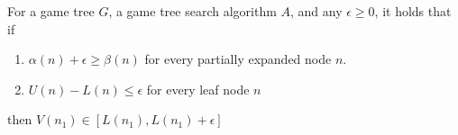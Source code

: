 \documentclass[runningheads]{llncs}
\newcommand{\MM}{\mathit{V}}
\newcommand{\pess}{\mathit{L}}
\newcommand{\opti}{\mathit{U}}
\newcommand{\rootnode}{\mathit{n_1}}
\begin{document}
\begin{theorem}
For a game tree $G$, a game tree search algorithm $A$, 
and any $\epsilon\geq 0$, it holds that if 
\begin{enumerate}
\item $\alpha(n)+\epsilon\geq \beta(n)$ for every partially expanded node $n$. 
\item $\opti(n)-\pess(n)\leq \epsilon$ for every leaf node $n$ 
\end{enumerate}
then $\MM(\rootnode)\in [\pess(\rootnode),\pess(\rootnode)+\epsilon]$
\label{the:basic}
\end{theorem}
\end{document}
